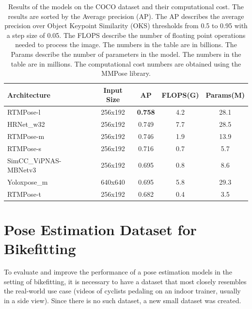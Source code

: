 \begin{table}[htb]

    \centering
    \begin{tabular}{lcccc}
        \toprule
        Architecture          & Input Size & AP             & FLOPS(G) & Params(M) \\
        \midrule
        RTMPose-l             & 256x192    & \textbf{0.758} & 4.2      & 28.1      \\
        HRNet\_w32            & 256x192    & 0.749          & 7.7      & 28.5      \\
        RTMPose-m             & 256x192    & 0.746          & 1.9      & 13.9      \\
        RTMPose-s             & 256x192    & 0.716          & 0.7      & 5.7       \\
        SimCC\_ViPNAS-MBNetv3 & 256x192    & 0.695          & 0.8      & 8.6       \\
        Yoloxpose\_m          & 640x640    & 0.695          & 5.8      & 29.3      \\
        RTMPose-t             & 256x192    & 0.682          & 0.4      & 3.5       \\


        \bottomrule
    \end{tabular}
    \caption{Results of the models on the COCO dataset and their computational cost. The results are sorted by the Average precision (AP). The AP describes the average precision over Object Keypoint Similarity (OKS) thresholds from 0.5 to 0.95 with a step size of 0.05. The FLOPS describe the number of floating point operations needed to process the image. The numbers in the table are in billions. The Params describe the number of parameters in the model. The numbers in the table are in millions. The computational cost numbers are obtained using the MMPose library.}
    \label{tab:evaluation_params}

\end{table}


\chapter{Pose Estimation Dataset for Bikefitting}
\label{ch:dataset}
To evaluate and improve the performance of a pose estimation models in the setting of bikefitting, it is necessary to have a dataset that most closely resembles the real-world use case (videos of cyclists pedaling on an indoor trainer, usually in a side view). Since there is no such dataset, a new small dataset was created.

